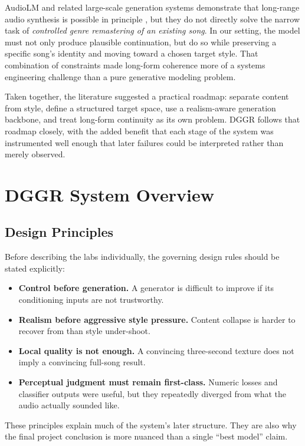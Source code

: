 \documentclass[conference]{IEEEtran}
\begin{document}
AudioLM and related large-scale generation systems demonstrate that long-range audio synthesis is possible in principle \cite{audiolm2023}, but they do not directly solve the narrow task of \emph{controlled genre remastering of an existing song}. In our setting, the model must not only produce plausible continuation, but do so while preserving a specific song's identity and moving toward a chosen target style. That combination of constraints made long-form coherence more of a systems engineering challenge than a pure generative modeling problem.

Taken together, the literature suggested a practical roadmap: separate content from style, define a structured target space, use a realism-aware generation backbone, and treat long-form continuity as its own problem. DGGR follows that roadmap closely, with the added benefit that each stage of the system was instrumented well enough that later failures could be interpreted rather than merely observed.

\section{DGGR System Overview}
\subsection{Design Principles}
Before describing the labs individually, the governing design rules should be stated explicitly:
\begin{itemize}[leftmargin=1.5em]
    \item \textbf{Control before generation.} A generator is difficult to improve if its conditioning inputs are not trustworthy.
    \item \textbf{Realism before aggressive style pressure.} Content collapse is harder to recover from than style under-shoot.
    \item \textbf{Local quality is not enough.} A convincing three-second texture does not imply a convincing full-song result.
    \item \textbf{Perceptual judgment must remain first-class.} Numeric losses and classifier outputs were useful, but they repeatedly diverged from what the audio actually sounded like.
\end{itemize}

These principles explain much of the system's later structure. They are also why the final project conclusion is more nuanced than a single ``best model'' claim.
\end{document}

